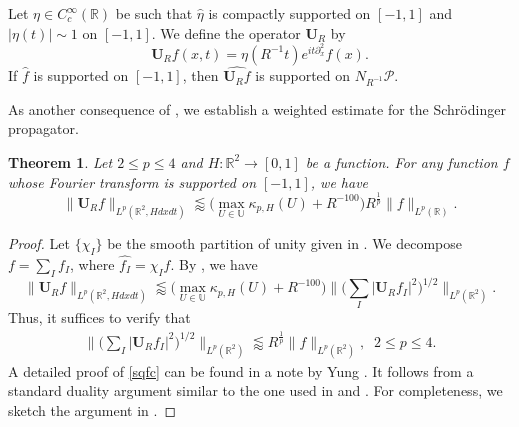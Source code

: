 \documentclass[11pt]{amsart}
\newtheorem{theorem}{Theorem}[section]
\theoremstyle{definition}
\theoremstyle{remark}
\renewcommand{\hat}{\widehat}
\newcommand{\R}{\mathbb{R}}
\newcommand{\cP}{\mathcal{P}}
\newcommand{\U}{\mathbb{U}}
\newcommand{\bU}{\mathbf{U}}
\newcommand{\less}{\lessapprox}
\begin{document}
Let $\eta \in C^\infty_c(\R)$ be such that $\widehat{\eta}$  is compactly supported on $[-1,1]$ and $|\eta(t)|\sim 1$ on $[-1,1]$. We define the operator $\mathbf{U}_R$ by 
\begin{equation}\label{eqn:defnU_R}
	\mathbf{U}_R f(x,t)=\eta(R^{-1}t)e^{it\partial_x^2}f(x).	
\end{equation}
If $\hat{f}$ is supported on $[-1,1]$, then $\hat{\mathbf {U}_R f}$ is supported on $N_{R^{-1}} \cP$. 

As another consequence of , we establish a weighted  estimate for the Schr\"odinger propagator. 
\begin{theorem}\label{thm:SchFreqLocal}
	Let $2\leq p\leq 4$ and $H:\R^2 \to [0,1]$ be a function. For any function $f$ whose Fourier transform is supported on $[-1,1]$, we have 
	\[ 
	\| \mathbf{U}_R f \|_{L^p(\R^2, Hdxdt)} \less  \big(\max_{U\in \U} \kappa_{p,H}(U) + R^{-100} \big) R^{\frac1p} \| f\|_{L^p(\R)}.
	\]	
\end{theorem}

\begin{proof}
Let $\{\chi_I\}$ be the smooth partition of unity given in . We decompose $f=\sum_{I} f_I$, where $\hat{f_I} =  \chi_I \hat{f}$. By , we have 
	\[ 
	\| \mathbf{U}_Rf \|_{L^p(\R^2, Hdxdt)}  \less  \big(\max_{U\in \U} \kappa_{p,H}(U) + R^{-100} \big) \big\| \big(\sum_I |\bU_R f_I|^2 \big)^{1/2}\big\|_{L^p(\R^2)}.
	\]	
	Thus, it suffices to verify that
	\begin{align}\label{sqfc}
		\Big\| \big(\sum_I | \mathbf{U}_R f_I|^2\big)^{1/2} \Big\|_{L^p(\R^2)}
		\less R^{\frac1p}\|f\|_{L^p(\R^2)}, \;\; 2\leq p\leq 4.
	\end{align}
	A detailed proof of \eqref{sqfc} can be found in a note by Yung \cite[Proof of Theorem 2]{Yung}. It follows from a standard duality argument similar to the one used in \cite{Co} and  \cite{MSS}. For completeness, we sketch the argument in .
\end{proof}
\end{document}
